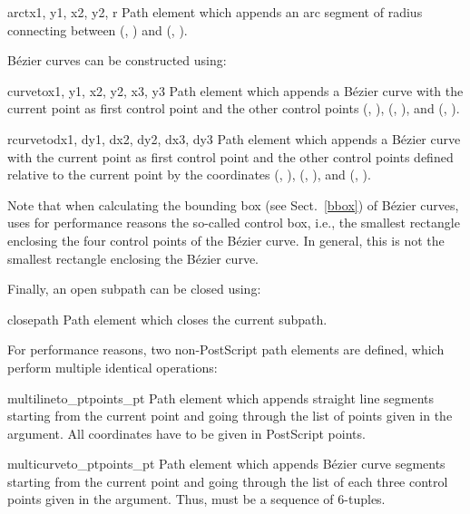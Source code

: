 \begin{classdesc}{arct}{x1, y1, x2, y2, r}
Path element which appends an arc segment of radius 
connecting between (, ) and (, ).\\
\end{classdesc}

B\'ezier curves can be constructed using: \

\begin{classdesc}{curveto}{x1, y1, x2, y2, x3, y3}
Path element which appends a B\'ezier curve with
the current point as first control point and the other control points
(, ), (, ), and (, ). 
\end{classdesc}

\begin{classdesc}{rcurveto}{dx1, dy1, dx2, dy2, dx3, dy3}
Path element which appends a B\'ezier curve with
the current point as first control point and the other control points
defined relative to the current point by the coordinates
(, ), (, ), and (, ). 
\end{classdesc}

Note that when calculating the bounding box (see Sect.~\ref{bbox}) of
B\'ezier curves, \PyX{} uses for performance reasons the so-called
control box, i.e., the smallest rectangle enclosing the four control
points of the B\'ezier curve. In general, this is not the smallest
rectangle enclosing the B\'ezier curve. 

Finally, an open subpath can be closed using:

\begin{classdesc}{closepath}{}
Path element which closes the current subpath. 
\end{classdesc}

For performance reasons, two non-PostScript path elements are defined, 
which perform multiple identical operations:

\begin{classdesc}{multilineto_pt}{points_pt}
Path element which appends straight line segments starting from
the current point and going through the list of points given 
in the  argument. All coordinates have to 
be given in PostScript points. 
\end{classdesc}

\begin{classdesc}{multicurveto_pt}{points_pt}
Path element which appends B\'ezier curve segments starting from
the current point and going through the list of each three control
points given in the  argument. Thus,  must be a
sequence of 6-tuples.
\end{classdesc}


